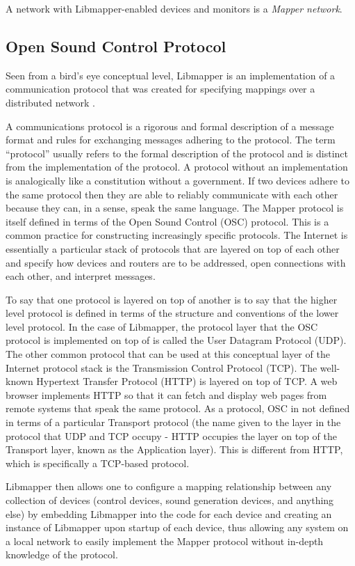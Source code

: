 A network with Libmapper-enabled devices and monitors is a \emph{Mapper network}.

\subsection{Open Sound Control Protocol}

Seen from a bird's eye conceptual level, Libmapper is an implementation of a communication protocol that was created for specifying mappings over a distributed network \cite{Malloch2009}. 

A communications protocol is a rigorous and formal description of a message format and rules for exchanging messages adhering to the protocol. The term ``protocol'' usually refers to the formal description of the protocol and is distinct from the implementation of the protocol. A protocol without an implementation is analogically like a constitution without a government. If two devices adhere to the same protocol then they are able to reliably communicate with each other because they can, in a sense, speak the same language. The Mapper protocol is itself defined in terms of the Open Sound Control (OSC) protocol. This is a common practice for constructing increasingly specific protocols. The Internet is essentially a particular stack of protocols that are layered on top of each other and specify how devices and routers are to be addressed, open connections with each other, and interpret messages.

To say that one protocol is layered on top of another is to say that the higher level protocol is defined in terms of the structure and conventions of the lower level protocol. In the case of Libmapper, the protocol layer that the OSC protocol is implemented on top of is called the User Datagram Protocol (UDP). The other common protocol that can be used at this conceptual layer of the Internet protocol stack is the Transmission Control Protocol (TCP). The well-known Hypertext Transfer Protocol (HTTP) is layered on top of TCP. A web browser implements HTTP so that it can fetch and display web pages from remote systems that speak the same protocol. As a protocol, OSC in not defined in terms of a particular Transport protocol (the name given to the layer in the protocol that UDP and TCP occupy - HTTP occupies the layer on top of the Transport layer, known as the Application layer). This is different from HTTP, which is specifically a TCP-based protocol.

Libmapper then allows one to configure a mapping relationship between any collection of devices (control devices, sound generation devices, and anything else) by embedding Libmapper into the code for each device and creating an instance of Libmapper upon startup of each device, thus allowing any system on a local network to easily implement the Mapper protocol without in-depth knowledge of the protocol.

